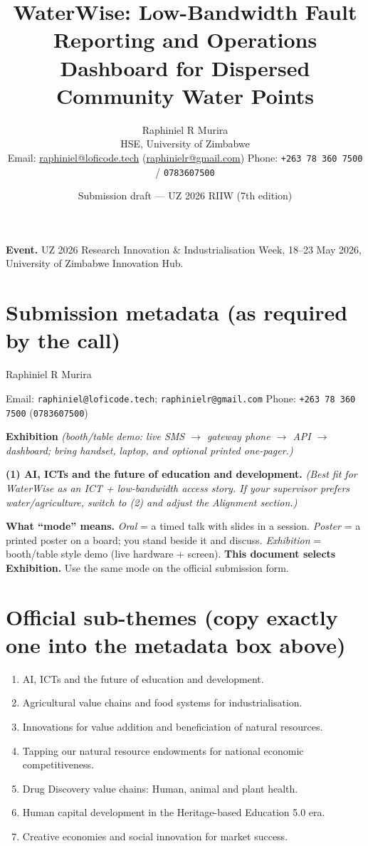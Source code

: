 \documentclass[11pt,a4paper]{article}
\title{\textbf{WaterWise: Low-Bandwidth Fault Reporting and Operations Dashboard for Dispersed Community Water Points}}
\author{%
  Raphiniel R Murira\\
  \small HSE, University of Zimbabwe\\
  \small Email: \href{mailto:raphiniel@loficode.tech}{raphiniel@loficode.tech} \;(\href{mailto:raphinielr@gmail.com}{raphinielr@gmail.com}) \quad Phone: \texttt{+263\,78\,360\,7500} / \texttt{0783607500}
}
\date{Submission draft --- UZ 2026 RIIW (7th edition)}
\begin{document}
\maketitle

\noindent\textbf{Event.} UZ 2026 Research Innovation \& Industrialisation Week, 18--23 May 2026, University of Zimbabwe Innovation Hub.

\section*{Submission metadata (as required by the call)}
\begin{description}[style=nextline,font=\normalfont\bfseries]
  \item[Lead author] Raphiniel R Murira
  \item[Contact] Email: \texttt{raphiniel@loficode.tech}; \texttt{raphinielr@gmail.com} \quad Phone: \texttt{+263\,78\,360\,7500} (\texttt{0783607500})
  \item[Mode of presentation] \textbf{Exhibition} \textit{(booth/table demo: live SMS $\rightarrow$ gateway phone $\rightarrow$ API $\rightarrow$ dashboard; bring handset, laptop, and optional printed one-pager.)}
  \item[Targeted sub-thematic area] \textbf{(1) AI, ICTs and the future of education and development.} \textit{(Best fit for WaterWise as an ICT + low-bandwidth access story. If your supervisor prefers water/agriculture, switch to (2) and adjust the Alignment section.)}
\end{description}

\noindent\small\textbf{What ``mode'' means.} \textit{Oral} = a timed talk with slides in a session. \textit{Poster} = a printed poster on a board; you stand beside it and discuss. \textit{Exhibition} = booth/table style demo (live hardware + screen). \textbf{This document selects Exhibition.} Use the same mode on the official submission form.

\section{Official sub-themes (copy exactly one into the metadata box above)}
\label{sec:themes}
\begin{enumerate}
  \item AI, ICTs and the future of education and development.
  \item Agricultural value chains and food systems for industrialisation.
  \item Innovations for value addition and beneficiation of natural resources.
  \item Tapping our natural resource endowments for national economic competitiveness.
  \item Drug Discovery value chains: Human, animal and plant health.
  \item Human capital development in the Heritage-based Education 5.0 era.
  \item Creative economies and social innovation for market success.
\end{enumerate}
\end{document}
